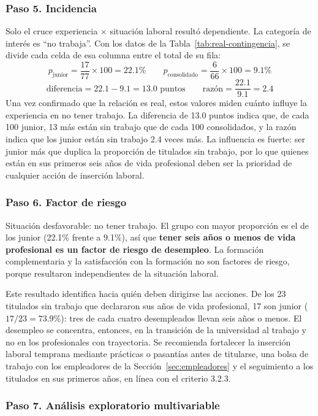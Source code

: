 \documentclass[12pt, a4paper]{article}
\begin{document}
\subsubsection{Paso 5. Incidencia}

Solo el cruce experiencia $\times$ situación laboral resultó dependiente.
La categoría de interés es ``no trabaja''. Con los datos de la
Tabla~\ref{tab:real-contingencia}, se divide cada celda de esa columna
entre el total de su fila:
\[
p_{\text{junior}} = \frac{17}{77} \times 100 = 22.1\% \qquad
p_{\text{consolidado}} = \frac{6}{66} \times 100 = 9.1\%
\]
\[
\text{diferencia} = 22.1 - 9.1 = 13.0 \text{ puntos} \qquad
\text{razón} = \frac{22.1}{9.1} = 2.4
\]
Una vez confirmado que la relación es real, estos valores miden cuánto
influye la experiencia en no tener trabajo. La diferencia de 13.0 puntos
indica que, de cada 100 junior, 13 más están sin trabajo que de cada 100
consolidados, y la razón indica que los junior están sin trabajo 2.4
veces más. La influencia es fuerte: ser junior más que duplica la
proporción de titulados sin trabajo, por lo que quienes están en sus
primeros seis años de vida profesional deben ser la prioridad de
cualquier acción de inserción laboral.

\subsubsection{Paso 6. Factor de riesgo}

Situación desfavorable: no tener trabajo. El grupo con mayor proporción
es el de los junior (22.1\% frente a 9.1\%), así que \textbf{tener seis
años o menos de vida profesional es un factor de riesgo de desempleo}. La
formación complementaria y la satisfacción con la formación no son
factores de riesgo, porque resultaron independientes de la situación
laboral.

Este resultado identifica hacia quién deben dirigirse las acciones. De
los 23 titulados sin trabajo que declararon sus años de vida
profesional, 17 son junior ($17/23 = 73.9\%$): tres de cada cuatro
desempleados llevan seis años o menos. El desempleo se concentra,
entonces, en la transición de la universidad al trabajo y no en los
profesionales con trayectoria. Se recomienda fortalecer la inserción
laboral temprana mediante prácticas o pasantías antes de titularse, una
bolsa de trabajo con los empleadores de la Sección~\ref{sec:empleadores}
y el seguimiento a los titulados en sus primeros años, en línea con el
criterio 3.2.3.

\subsubsection{Paso 7. Análisis exploratorio multivariable}
\end{document}
